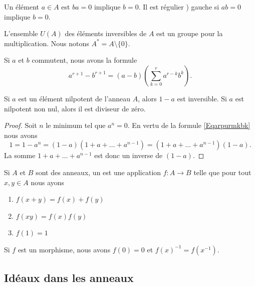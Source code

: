 Un élément \( a\in A\) est  \( ba=0\) implique \( b=0\). Il est régulier ) gauche si \( ab=0\) implique \( b=0\).

L'ensemble \( U(A)\) des éléments inversibles de \( A\) est un groupe pour la multiplication. Nous notons \( A^*=A\setminus\{ 0 \}\).

\begin{lemma}
    Si \( a\) et \( b\) commutent, nous avons la formule
    \begin{equation}        \label{Eqarpurmkbk}
        a^{r+1}-b^{r+1}=(a-b)(\sum_{k=0}^ra^{r-k}b^k).
    \end{equation}
\end{lemma}

\begin{proposition}
    Si \( a\) est un élément nilpotent de l'anneau \( A\), alors \( 1-a\) est inversible. Si \( a\) est nilpotent non nul, alors il est diviseur de zéro.
\end{proposition}

\begin{proof}
    Soit \( n\) le minimum tel que \( a^n=0\). En vertu de la formule \eqref{Eqarpurmkbk} nous avons
    \begin{equation}
        1=1-a^n=(1-a)(1+a+\ldots+a^{n-1})=(1+a+\ldots+a^{n-1})(1-a).
    \end{equation}
    La somme \( 1+a+\ldots+a^{n-1}\) est donc un inverse de \( (1-a)\).
\end{proof}

\begin{definition}
    Si \( A\) et \( B\) sont des anneaux, un  est une application \( f\colon A\to B\) telle que pour tout \( x,y\in A\) nous ayons
    \begin{enumerate}
        \item
            \( f(x+y)=f(x)+f(y)\)
        \item
            \( f(xy)=f(x)f(y)\)
        \item
            \( f(1)=1\)
    \end{enumerate}
\end{definition}

Si \( f\) est un morphisme, nous avons \( f(0)=0\) et \( f(x)^{-1}=f(x^{-1})\).

\subsection{Idéaux dans les anneaux}


